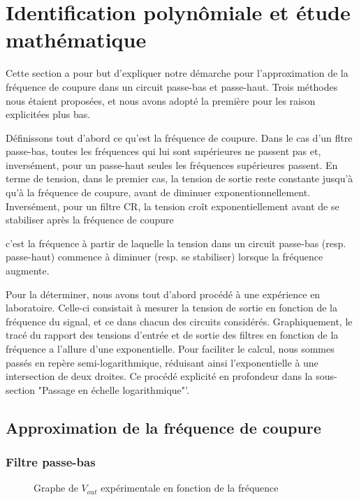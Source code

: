 
\section{Identification polynômiale et étude mathématique}

Cette section a pour but d'expliquer notre démarche pour l'approximation de la fréquence de coupure
dans un circuit passe-bas et passe-haut. Trois méthodes nous étaient proposées, et nous avons adopté 
la première pour les raison explicitées plus bas.

Définissons tout d'abord ce qu'est la fréquence de coupure. Dans le cas d'un fltre passe-bas, toutes les fréquences qui 
lui sont supérieures ne passent pas et, inversément, pour un passe-haut seules les fréquences supérieures passent. 
En terme de tension, dans le premier cas, la tension de sortie reste constante jusqu'à qu'à la fréquence de coupure, 
avant de diminuer exponentionnellement. Inversément, pour un filtre CR, la tension croît exponentiellement avant de 
se stabiliser après la fréquence de coupure
 

c'est la fréquence à partir de laquelle 
la tension dans un circuit passe-bas (resp. passe-haut) commence à diminuer (resp. se stabiliser) 
lorsque la fréquence augmente.

Pour la déterminer, nous avons tout d'abord procédé à une expérience en laboratoire.
Celle-ci consistait à mesurer la tension de sortie en fonction de la fréquence du signal, et ce dans 
chacun des circuits considérés.
Graphiquement, le tracé du rapport des tensions d'entrée et de sortie des filtres en fonction de la 
fréquence a l'allure d'une exponentielle.  Pour faciliter le calcul, nous sommes passés en repère 
semi-logarithmique, réduisant ainsi l'exponentielle à une intersection de deux droites. Ce procédé
explicité en profondeur dans la sous-section "Passage en échelle logarithmique"'.

\subsection{Approximation de la fréquence de coupure}

\subsubsection{Filtre passe-bas}

\begin{figure}[ht!]
\centering
{}
\caption{Graphe de $V_{out}$ expérimentale en fonction de la fréquence}
\label{lwp_ratio}
\end{figure}


